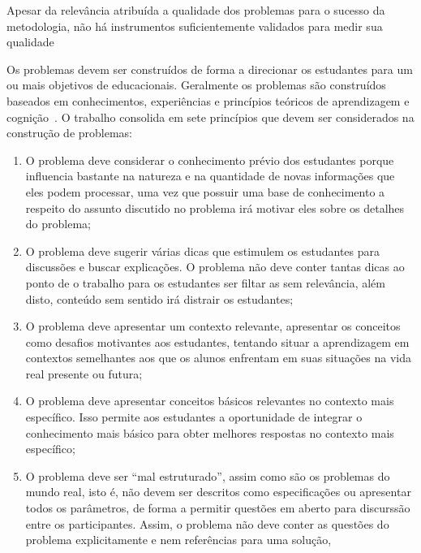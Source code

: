Apesar da relevância atribuída a qualidade dos problemas para o
sucesso da metodologia, não há instrumentos suficientemente
validados para medir sua
qualidade~\cite{des1999delphi,sockalingam2012assessing}

Os problemas devem ser construídos de forma a
direcionar os estudantes
para um ou mais objetivos de educacionais.
Geralmente os problemas são construídos baseados em conhecimentos,
experiências e princípios teóricos de aprendizagem e
cognição~\cite{des1999delphi,dolmans1997seven}.
O trabalho \cite{dolmans1997seven} consolida em sete
princípios que devem ser considerados na construção
de problemas:

\begin{enumerate}
\item{O problema deve considerar o conhecimento
prévio dos estudantes porque influencia bastante na
natureza e na quantidade de novas informações que
eles podem processar, uma vez que possuir
uma base de conhecimento a respeito do assunto
discutido no problema irá motivar eles sobre os
detalhes do problema;}
\item{O problema deve sugerir várias dicas
que estimulem os estudantes para discussões
e buscar explicações. O problema não deve
conter tantas dicas ao ponto de o trabalho
para os estudantes ser filtar as sem relevância,
além disto, conteúdo sem sentido irá distrair
os estudantes;}
\item{O problema deve apresentar um contexto relevante,
apresentar os conceitos como desafios motivantes aos
estudantes, tentando situar a aprendizagem em contextos
semelhantes aos que os alunos enfrentam em suas
situações na vida real presente ou futura;}
\item{O problema deve apresentar conceitos básicos
relevantes no contexto mais específico.
Isso permite aos estudantes a oportunidade
de integrar o conhecimento mais básico para obter melhores
respostas no contexto mais específico;}
\item{O problema deve ser ``mal estruturado'', assim como
são os problemas do mundo real, isto é, não
devem ser descritos como especificações ou apresentar
todos os parâmetros, de forma a permitir questões em
aberto para discurssão entre os participantes.
Assim, o problema não deve conter as questões do problema
explicitamente e nem referências para uma solução,
}
\end{enumerate}
